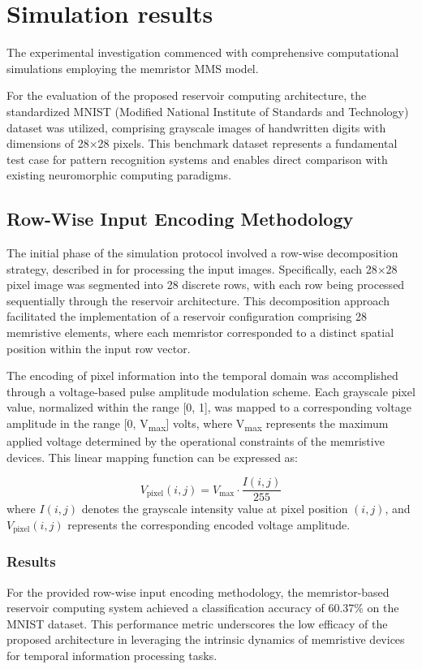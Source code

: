 \documentclass[11pt, oneside]{article}
\begin{document}
\section{Simulation results}

The experimental investigation commenced with comprehensive computational simulations employing the memristor MMS  model.

For the evaluation of the proposed reservoir computing architecture, the standardized MNIST (Modified National Institute of Standards and Technology) dataset was utilized, comprising grayscale images of handwritten digits with dimensions of 28×28 pixels. This benchmark dataset represents a fundamental test case for pattern recognition systems and enables direct comparison with existing neuromorphic computing paradigms.

\subsection{Row-Wise Input Encoding Methodology}

The initial phase of the simulation protocol involved a row-wise decomposition strategy, described in \autocite{Du2017} for processing the input images. Specifically, each 28×28 pixel image was segmented into 28 discrete rows, with each row being processed sequentially through the reservoir architecture. This decomposition approach facilitated the implementation of a reservoir configuration comprising 28 memristive elements, where each memristor corresponded to a distinct spatial position within the input row vector.

The encoding of pixel information into the temporal domain was accomplished through a voltage-based pulse amplitude modulation scheme. Each grayscale pixel value, normalized within the range [0, 1], was mapped to a corresponding voltage amplitude in the range [0, V\textsubscript{max}] volts, where V\textsubscript{max} represents the maximum applied voltage determined by the operational constraints of the memristive devices. This linear mapping function can be expressed as:

\begin{equation}
    V_{\text{pixel}}(i,j) = V_{\text{max}} \cdot \frac{I(i,j)}{255}
\end{equation}
where \(I(i,j)\) denotes the grayscale intensity value at pixel position \((i,j)\), and \(V_{\text{pixel}}(i,j)\) represents the corresponding encoded voltage amplitude.

\subsubsection{Results}
For the provided row-wise input encoding methodology, the memristor-based reservoir computing system achieved a classification accuracy of 60.37\% on the MNIST dataset. This performance metric underscores the low efficacy of the proposed architecture in leveraging the intrinsic dynamics of memristive devices for temporal information processing tasks.
\end{document}
